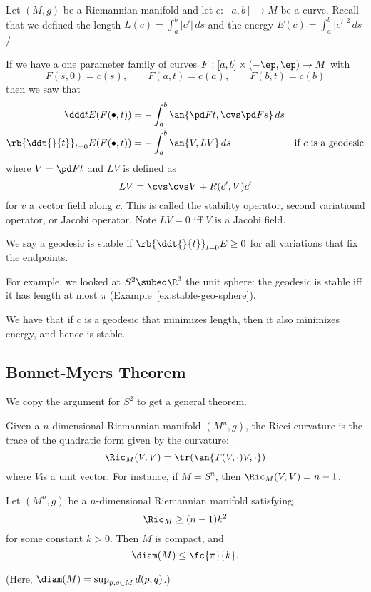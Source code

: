
Let $(M,g)$ be a Riemannian manifold and let $c:[a,b]\to M$ be a curve. Recall that we defined the length $L(c)=\int_a^b |c'|\,ds$ and the energy $E(c)=\int_a^b|c'|^2\,ds$/

If we have a one parameter family of curves $F:[a,b]\times (-\ep,\ep)\to M$ with
\[F(s,0)=c(s),\qquad F(a,t)=c(a),\qquad F(b,t)=c(b)\]
then we saw that 
\begin{align*}
\ddd tE(F(\bullet,t))&=-\int_a^b \an{\pd Ft,\cvs \pd Fs}\,ds\\
\rb{\ddt{}{t}}_{t=0} E(F(\bullet,t))&= -\int_a^b \an{V,LV}\,ds&\text{if $c$ is a geodesic}
\end{align*}
where $V=\pd Ft$ and $LV$ is defined as
\[
LV=\cvs \cvs V+R(c',V)c'
\]
for $v$ a vector field along $c$. This is called the stability operator, second variational operator, or Jacobi operator. Note $LV=0$ iff $V$ is a Jacobi field.

We say a geodesic is stable if $\rb{\ddt{}{t}}_{t=0}E\ge 0$ for all variations that fix the endpoints.

For example, we looked at $S^2\subeq \R^3$ the unit sphere: the geodesic is stable iff it has length at most $\pi$ (Example~\ref{ex:stable-geo-sphere}).

We have that if $c$ is a geodesic that minimizes length, then it also minimizes energy, and hence is stable.

\subsection{Bonnet-Myers Theorem}

We copy the argument for $S^2$ to get a general theorem.

Given a $n$-dimensional Riemannian manifold $(M^n,g)$, the Ricci curvature is the trace of the quadratic form given by the curvature:
\[
\Ric_M(V,V)=\tr(\an{T(V,\cdot)V,\cdot})
\]
where $V$is a unit vector. For instance, if $M=S^n$, then $\Ric_M(V,V)=n-1$.

\begin{thm}
Let $(M^n,g)$ be a $n$-dimensional Riemannian manifold satisfying 
\[
\Ric_M\ge (n-1)k^2
\]
for some constant $k>0$. Then $M$ is compact, and 
\[
\diam(M)\le \fc{\pi}{k}.
\]
\end{thm}
(Here, $\diam(M)=\sup_{p,q\in M}d(p,q)$.)

